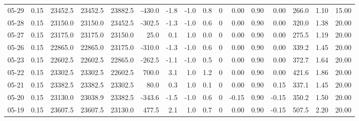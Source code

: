 \begin{threeparttable}
{\begin{tabular}{lrrrrrrrrrrrrrrr}
  05-29 &     0.15 & 23452.5 & 23452.5 & 23882.5 &     -430.0 &           -1.8 &                     -1.0 &                 0.8 &              0 &       0.00 &      0.90 &           0.00 &            266.0 &            1.10 &                  15.00 \\
  05-28 &     0.15 & 23150.0 & 23150.0 & 23452.5 &     -302.5 &           -1.3 &                     -1.0 &                 0.6 &              0 &       0.00 &      0.90 &           0.00 &            320.0 &            1.38 &                  20.00 \\
  05-27 &     0.15 & 23175.0 & 23175.0 & 23150.0 &       25.0 &            0.1 &                      1.0 &                 0.0 &              0 &       0.00 &      0.90 &           0.00 &            275.5 &            1.19 &                  20.00 \\
  05-26 &     0.15 & 22865.0 & 22865.0 & 23175.0 &     -310.0 &           -1.3 &                     -1.0 &                 0.6 &              0 &       0.00 &      0.90 &           0.00 &            339.2 &            1.45 &                  20.00 \\
  05-23 &     0.15 & 22602.5 & 22602.5 & 22865.0 &     -262.5 &           -1.1 &                     -1.0 &                 0.5 &              0 &       0.00 &      0.90 &           0.00 &            372.7 &            1.64 &                  20.00 \\
  05-22 &     0.15 & 23302.5 & 23302.5 & 22602.5 &      700.0 &            3.1 &                      1.0 &                 1.2 &              0 &       0.00 &      0.90 &           0.00 &            421.6 &            1.86 &                  20.00 \\
  05-21 &     0.15 & 23382.5 & 23382.5 & 23302.5 &       80.0 &            0.3 &                      1.0 &                 0.1 &              0 &       0.00 &      0.90 &           0.15 &            337.1 &            1.45 &                  20.00 \\
  05-20 &     0.15 & 23130.0 & 23038.9 & 23382.5 &     -343.6 &           -1.5 &                     -1.0 &                 0.6 &              0 &      -0.15 &      0.90 &          -0.15 &            350.2 &            1.50 &                  20.00 \\
  05-19 &     0.15 & 23607.5 & 23607.5 & 23130.0 &      477.5 &            2.1 &                      1.0 &                 0.7 &              0 &       0.00 &      0.90 &          -0.15 &            507.5 &            2.20 &                  20.00 \\

\end{tabular}}
\end{threeparttable}
